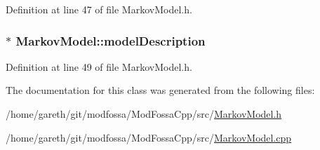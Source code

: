 Definition at line 47 of file MarkovModel.h.

\hypertarget{classMarkovModel_acb12261525cf0a48bb92d10078a94fbc}{
\subsubsection[{modelDescription}]{$\ast$ {\bf MarkovModel::modelDescription}}}
\label{classMarkovModel_acb12261525cf0a48bb92d10078a94fbc}


Definition at line 49 of file MarkovModel.h.



The documentation for this class was generated from the following files:\begin{DoxyCompactItemize}
\item 
/home/gareth/git/modfossa/ModFossaCpp/src/\hyperlink{MarkovModel_8h}{MarkovModel.h}\item 
/home/gareth/git/modfossa/ModFossaCpp/src/\hyperlink{MarkovModel_8cpp}{MarkovModel.cpp}\end{DoxyCompactItemize}
